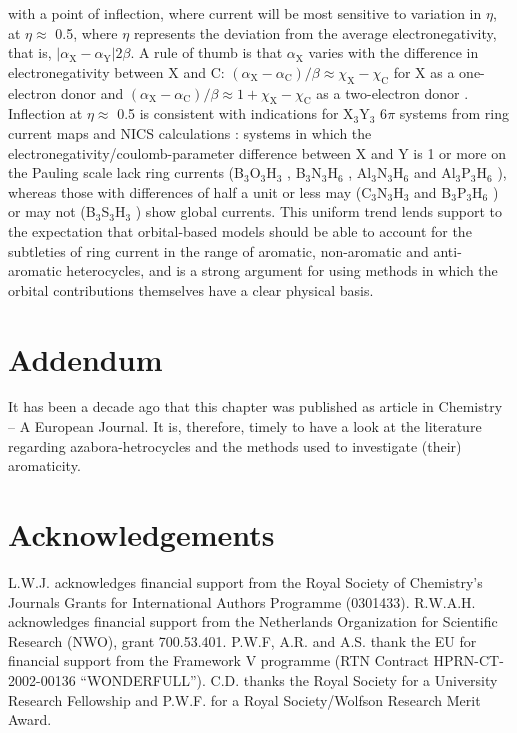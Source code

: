 with a point of inflection, where current will be most sensitive to variation in $\eta$, at $\eta \approx$ 0.5, where $\eta$ represents the deviation
from the average electronegativity, that is, $| \alpha_\mathrm{X}- \alpha_\mathrm{Y} | 2\beta$. A rule of thumb is that $\alpha_\mathrm{X}$
varies with the difference in electronegativity between X and C: $(\alpha_\mathrm{X} - \alpha_\mathrm{C})/\beta \approx \chi_\mathrm{X}-\chi_\mathrm{C}$
for X as a one-electron donor and  $(\alpha_\mathrm{X} - \alpha_\mathrm{C})/\beta \approx 1 + \chi_\mathrm{X}-\chi_\mathrm{C}$ as a two-electron
donor \cite{r22a}. Inflection at $\eta\approx$ 0.5 is consistent with indications for X$_3$Y$_3$ 6$\pi$ systems from ring current maps \cite{r02} and
NICS calculations \cite{r27c}: systems in which the electronegativity/coulomb-parameter difference between X and Y is 1 or
more on the Pauling scale lack ring currents (B$_3$O$_3$H$_3$ \cite{r02,r27c}, B$_3$N$_3$H$_6$ \cite{r02,r27c}, Al$_3$N$_3$H$_6$ \cite{r27c} and
Al$_3$P$_3$H$_6$ \cite{r27c}), whereas those with differences of half a unit or less may (C$_3$N$_3$H$_3$ \cite{r02,r27c} and B$_3$P$_3$H$_6$ \cite{r27c})
or may not (B$_3$S$_3$H$_3$ \cite{r27c}) show global currents. This uniform trend lends support to the expectation that orbital-based models should be able to
account for the subtleties of ring current in the range of aromatic, non-aromatic and anti-aromatic heterocycles, and is a strong argument for
using methods in which the orbital contributions themselves have a clear physical basis.

\section*{Addendum}
It has been a decade ago that this chapter was published as article in Chemistry -- A European Journal. It is, therefore, timely to have a look at the literature regarding azabora-hetrocycles and the methods used to investigate (their) aromaticity.



\section*{Acknowledgements}
L.W.J. acknowledges financial support from the Royal Society of Chemistry's Journals Grants for International Authors Programme (0301433).
R.W.A.H. acknowledges financial support from the Netherlands Organization for Scientific Research (NWO), grant 700.53.401. P.W.F, A.R. and
A.S. thank the EU for financial support from the Framework V programme (RTN Contract HPRN-CT-2002-00136 ``WONDERFULL'').
C.D. thanks the Royal Society for a University Research Fellowship and P.W.F. for a Royal Society/Wolfson Research Merit Award.



